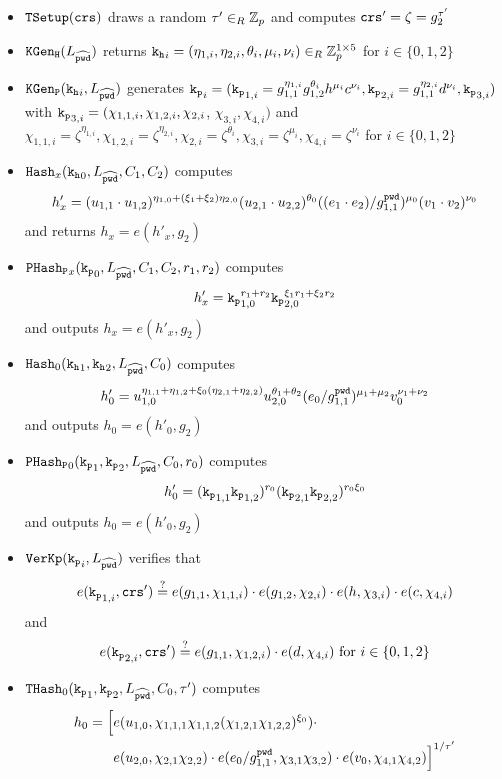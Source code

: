 \begin{itemize}
	\item $\mathtt{TSetup}(\mathtt{crs})$ draws a random $\tau'\in_R\mathbb{Z}_p$ and computes $\mathtt{crs}'=\zeta=g_2^{\tau'}$
	
	\item $\mathtt{KGen_H}(L_{\widehat{\mathtt{pwd}}})$ returns $\mathtt{k_h}_i=(\eta_{1,i},\eta_{2,i},\theta_i,\mu_i,\nu_i)\in_R\mathbb{Z}_p^{1\times 5}$ for $i\in\{0,1,2\}$
	
  \item $\mathtt{KGen_P}(\mathtt{k_h}_i, L_{\widehat{\mathtt{pwd}}})$ generates 
      $\mathtt{k_p}_i=(\mathtt{k_p}_{1,i}=g_{1,1}^{\eta_{1,i}} g_{1,2}^{\theta_i} h^{\mu_i} c^{\nu_i}, \mathtt{k_p}_{2,i}=g_{1,1}^{\eta_{2,i}} d^{\nu_i}, \mathtt{k_p}_{3,i})$ with
      $\mathtt{k_p}_{3,i}=(\chi_{1,1,i}, \chi_{1,2,i}, \chi_{2,i}$, $\chi_{3,i}, \chi_{4,i})$ and 
      $\chi_{1,1,i}={\zeta}^{\eta_{1,i}}, \chi_{1,2,i}={\zeta}^{\eta_{2,i}}, \chi_{2,i}={\zeta}^{\theta_i}, \chi_{3,i}={\zeta}^{\mu_i}, \chi_{4,i}={\zeta}^{\nu_i}$ for $i\in\{0,1,2\}$
  
  \item $\mathtt{Hash}_x(\mathtt{k_h}_0, L_{\widehat{\mathtt{pwd}}}, C_1, C_2)$ computes 
      \[h'_x=(u_{1,1}\cdot u_{1,2})^{\eta_{1,0}+(\xi_1+\xi_2)\eta_{2,0}} (u_{2,1}\cdot u_{2,2})^{\theta_0} ((e_1\cdot e_2)/g_{1,1}^{\mathtt{pwd}})^{\mu_0} (v_1\cdot v_2)^{\nu_0}\]
      and returns $h_x=e(h'_x,g_2)$
  \item $\mathtt{PHash_P}_x(\mathtt{k_p}_0, L_{\widehat{\mathtt{pwd}}}, C_1, C_2, r_1, r_2)$ computes 
      \[h'_x=\mathtt{k_p}_{1,0}^{r_1+r_2} \mathtt{k_p}_{2,0}^{\xi_1 r_1+\xi_2 r_2}\]
      and outputs $h_x=e(h'_x,g_2)$
  \item $\mathtt{Hash}_0(\mathtt{k_h}_1, \mathtt{k_h}_2, L_{\widehat{\mathtt{pwd}}}, C_0)$ computes 
      \[h'_0=u_{1,0}^{\eta_{1,1}+\eta_{1,2}+\xi_0(\eta_{2,1}+\eta_{2,2})} u_{2,0}^{\theta_1+\theta_2} (e_0/g_{1,1}^{\mathtt{pwd}})^{\mu_1+\mu_2} v_0^{\nu_1+\nu_2}\]
      and outputs $h_0=e(h'_0,g_2)$
  \item $\mathtt{PHash_P}_0(\mathtt{k_p}_1, \mathtt{k_p}_2, L_{\widehat{\mathtt{pwd}}}, C_0, r_0)$ computes 
      \[h'_0=(\mathtt{k_p}_{1,1}\mathtt{k_p}_{1,2})^{r_0} (\mathtt{k_p}_{2,1}\mathtt{k_p}_{2,2})^{r_0\xi_0}\]
      and outputs $h_0=e(h'_0,g_2)$
	
  \item $\mathtt{VerKp}(\mathtt{k_p}_i, L_{\widehat{\mathtt{pwd}}})$ verifies that 
      \[e(\mathtt{k_p}_{1,i}, \mathtt{crs}')\stackrel{?}{=} e(g_{1,1}, \chi_{1,1,i})\cdot e(g_{1,2}, \chi_{2,i})\cdot e(h, \chi_{3,i})\cdot e(c, \chi_{4,i})\]
      and
      \[e(\mathtt{k_p}_{2,i}, \mathtt{crs}') \stackrel{?}{=} e(g_{1,1}, \chi_{1,2,i})\cdot e(d, \chi_{4,i}) \text{ for } i\in\{0,1,2\}\]

  \item $\mathtt{THash}_0(\mathtt{k_p}_1, \mathtt{k_p}_2, L_{\widehat{\mathtt{pwd}}}, C_0, \tau')$ computes 
      \begin{align*}        
        h_0 = \Big[ & e(u_{1,0}, \chi_{1,1,1}\chi_{1,1,2}(\chi_{1,2,1}\chi_{1,2,2})^{\xi_0})\cdot \\
        & e(u_{2,0}, \chi_{2,1}\chi_{2,2})\cdot e(e_0/g_{1,1}^{\mathtt{pwd}}, \chi_{3,1}\chi_{3,2})\cdot e(v_0, \chi_{4,1}\chi_{4,2}) \Big]^{1/\tau'}
      \end{align*}
			

\end{itemize}

